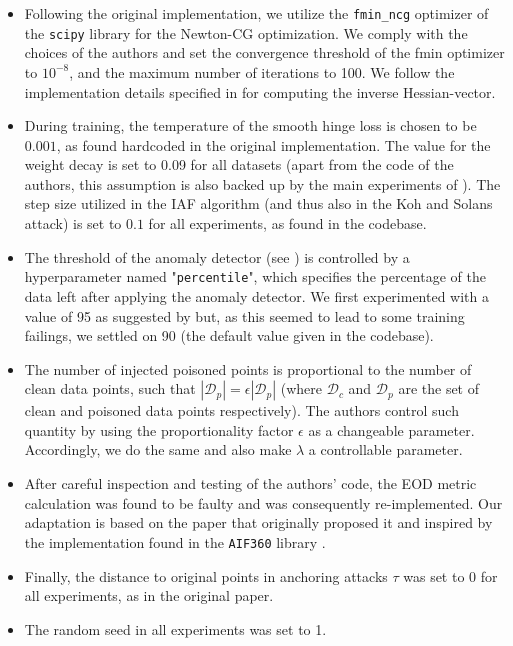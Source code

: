 \begin{itemize}
    \item Following the original implementation, we utilize the \texttt{fmin\_ncg} optimizer of the \texttt{scipy} library \citep{scipy} for the Newton-CG optimization. We comply with the choices of the authors and set the convergence threshold of the fmin optimizer to $10^{-8}$, and the maximum number of iterations to 100. We follow the implementation details specified in \cite{koh2018} for computing the inverse Hessian-vector.
    
    \item During training, the temperature of the smooth hinge loss is chosen to be $0.001$, as found hardcoded in the original implementation. The value for the weight decay is set to 0.09 for all datasets (apart from the code of the authors, this assumption is also backed up by the main experiments of \citet{koh2018}). The step size utilized in the IAF algorithm (and thus also in the Koh and Solans attack) is set to $0.1$ for all experiments, as found in the codebase.
    
    \item The threshold of the anomaly detector (see \cite{koh2018}) is controlled by a hyperparameter named "\texttt{percentile}", which specifies the percentage of the data left after applying the anomaly detector. We first experimented with a value of 95 as suggested by \citet{koh2018} but, as this seemed to lead to some training failings, we settled on 90 (the default value given in the codebase).
    
    \item The number of injected poisoned points is proportional to the number of clean data points, such that $|\mathcal{D}_p| = \epsilon|\mathcal{D}_p|$ (where $\mathcal{D}_c$ and $\mathcal{D}_p$ are the set of clean and poisoned data points respectively). The authors control such quantity by using the proportionality factor $\epsilon$ as a changeable parameter. Accordingly, we do the same and also make $\lambda$ a controllable parameter.
    
    \item After careful inspection and testing of the authors' code, the EOD metric calculation was found to be faulty and was consequently re-implemented. Our adaptation is based on the paper that originally proposed it \cite{EOD-measure} and inspired by the implementation found in the \texttt{AIF360} library \citep{aif360}.
    
    \item Finally, the distance to original points in anchoring attacks $\tau$ was set to 0 for all experiments, as in the original paper. 
    
    \item The random seed in all experiments was set to 1.
    
\end{itemize}

